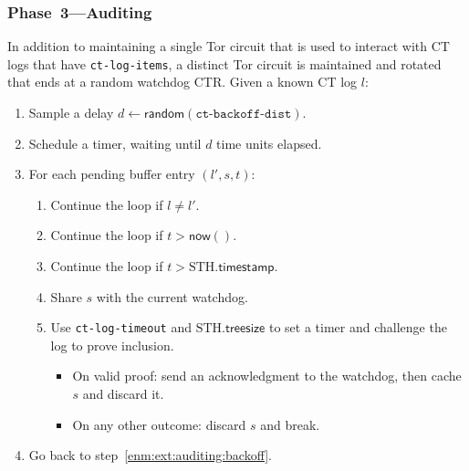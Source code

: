 \subsubsection{Phase~3---Auditing} \label{sec:auditor:design:auditing}
In addition to maintaining a single Tor circuit that is used to interact with
CT logs that have \texttt{ct-log-items}, a distinct Tor circuit is maintained
and rotated that ends at a random watchdog CTR.  Given a known CT log
$l$:
\begin{enumerate}
	\item\label{enm:ext:auditing:backoff} Sample a delay $d \gets
		\mathsf{random}(\texttt{ct-backoff-dist})$.
	\item\label{enm:ext:auditing:sleep} Schedule a timer, waiting until $d$
		time units elapsed.
	\item\label{enm:auditing:loop} For each pending buffer entry $(l',s,t)$:
		\begin{enumerate}
			\item\label{enm:ext:auditing:log-check}
				Continue the loop if $l\ne l'$.
			\item\label{enm:ext:auditing:timestamp-check} Continue the loop if
				$t > \mathsf{now}()$.
			\item\label{enm:ext:auditing:sth-check} Continue the loop if $t >
				\textrm{STH}.\mathsf{timestamp}$.
			\item\label{enm:ext:auditing:watchdog} Share $s$ with the current
				watchdog.
			\item\label{enm:ext:auditing:challenge} Use \texttt{ct-log-timeout}
				and $\textrm{STH}.\mathsf{treesize}$ to set a timer and
				challenge the log to prove inclusion.
				\begin{itemize}
					\item\label{enm:ext:auditing:challenge:success} On valid
						proof: send an acknowledgment to the watchdog, then
						cache $s$ and discard it.
					\item\label{enm:ext:auditing:challenge:fail} On any other
						outcome: discard $s$ and break.
				\end{itemize}
		\end{enumerate}
	\item\label{enm:ext:auditing:restart} Go back to
		step~\ref{enm:ext:auditing:backoff}.
\end{enumerate}

